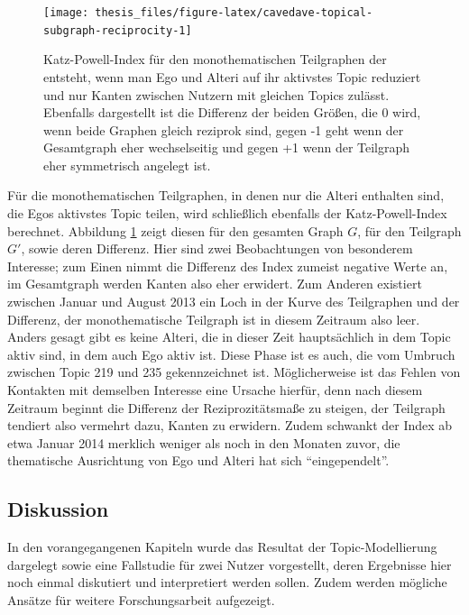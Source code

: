 \documentclass[11pt,a4paper,twoside]{article}
\begin{document}
\begin{figure}

{\centering \texttt{[image: thesis\_files/figure-latex/cavedave-topical-subgraph-reciprocity-1]} 

}

\caption{Katz-Powell-Index für den
monothematischen Teilgraphen der entsteht, wenn man Ego und Alteri auf
ihr aktivstes Topic reduziert und nur Kanten zwischen Nutzern mit
gleichen Topics zulässt. Ebenfalls dargestellt ist die Differenz der
beiden Größen, die 0 wird, wenn beide Graphen gleich reziprok sind,
gegen -1 geht wenn der Gesamtgraph eher wechselseitig und gegen +1 wenn
der Teilgraph eher symmetrisch angelegt ist.}\label{fig:cavedave-topical-subgraph-reciprocity}
\end{figure}

Für die monothematischen Teilgraphen, in denen nur die Alteri enthalten
sind, die Egos aktivstes Topic teilen, wird schließlich ebenfalls der
Katz-Powell-Index berechnet. Abbildung
\ref{fig:cavedave-topical-subgraph-reciprocity} zeigt diesen für den
gesamten Graph \(G\), für den Teilgraph \(G'\), sowie deren Differenz.
Hier sind zwei Beobachtungen von besonderem Interesse; zum Einen nimmt
die Differenz des Index zumeist negative Werte an, im Gesamtgraph werden
Kanten also eher erwidert. Zum Anderen existiert zwischen Januar und
August 2013 ein Loch in der Kurve des Teilgraphen und der Differenz, der
monothematische Teilgraph ist in diesem Zeitraum also leer. Anders
gesagt gibt es keine Alteri, die in dieser Zeit hauptsächlich in dem
Topic aktiv sind, in dem auch Ego aktiv ist. Diese Phase ist es auch,
die vom Umbruch zwischen Topic 219 und 235 gekennzeichnet ist.
Möglicherweise ist das Fehlen von Kontakten mit demselben Interesse eine
Ursache hierfür, denn nach diesem Zeitraum beginnt die Differenz der
Reziprozitätsmaße zu steigen, der Teilgraph tendiert also vermehrt dazu,
Kanten zu erwidern. Zudem schwankt der Index ab etwa Januar 2014
merklich weniger als noch in den Monaten zuvor, die thematische
Ausrichtung von Ego und Alteri hat sich \enquote{eingependelt}.

\cleardoublepage

\hypertarget{diskussion}{%
\subsection{Diskussion}\label{diskussion}}

In den vorangegangenen Kapiteln wurde das Resultat der
Topic-Modellierung dargelegt sowie eine Fallstudie für zwei Nutzer
vorgestellt, deren Ergebnisse hier noch einmal diskutiert und
interpretiert werden sollen. Zudem werden mögliche Ansätze für weitere
Forschungsarbeit aufgezeigt.
\end{document}

